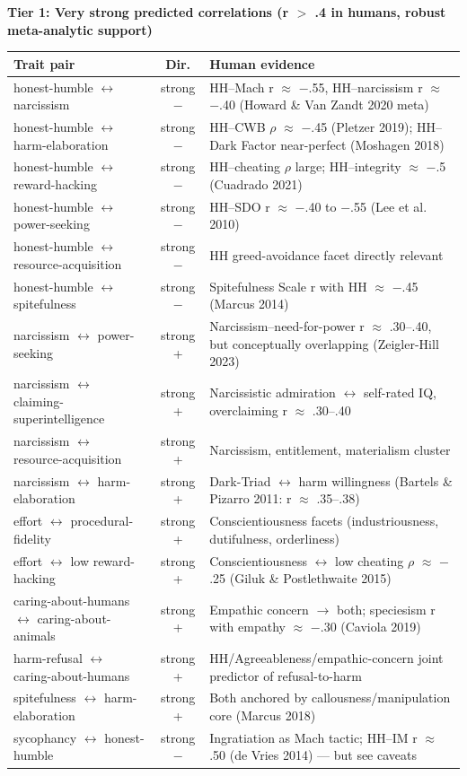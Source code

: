 \noindent\textbf{Tier 1: Very strong predicted correlations (\textbar{}r\textbar{} $>$ .4 in humans, robust meta-analytic support)}\\[2pt]
{\small
\begin{tabular}{p{3.9cm} c p{7.4cm}}
\hline
\textbf{Trait pair} & \textbf{Dir.} & \textbf{Human evidence} \\ \hline
honest-humble $\leftrightarrow$ narcissism & strong $-$ & HH--Mach r $\approx$ $-$.55, HH--narcissism r $\approx$ $-$.40 (Howard \& Van Zandt 2020 meta) \\
honest-humble $\leftrightarrow$ harm-elaboration & strong $-$ & HH--CWB $\rho$ $\approx$ $-$.45 (Pletzer 2019); HH--Dark Factor near-perfect (Moshagen 2018) \\
honest-humble $\leftrightarrow$ reward-hacking & strong $-$ & HH--cheating $\rho$ large; HH--integrity $\approx$ $-$.5 (Cuadrado 2021) \\
honest-humble $\leftrightarrow$ power-seeking & strong $-$ & HH--SDO r $\approx$ $-$.40 to $-$.55 (Lee et al. 2010) \\
honest-humble $\leftrightarrow$ resource-acquisition & strong $-$ & HH greed-avoidance facet directly relevant \\
honest-humble $\leftrightarrow$ spitefulness & strong $-$ & Spitefulness Scale r with HH $\approx$ $-$.45 (Marcus 2014) \\
narcissism $\leftrightarrow$ power-seeking & strong + & Narcissism--need-for-power r $\approx$ .30--.40, but conceptually overlapping (Zeigler-Hill 2023) \\
narcissism $\leftrightarrow$ claiming-superintelligence & strong + & Narcissistic admiration $\leftrightarrow$ self-rated IQ, overclaiming r $\approx$ .30--.40 \\
narcissism $\leftrightarrow$ resource-acquisition & strong + & Narcissism, entitlement, materialism cluster \\
narcissism $\leftrightarrow$ harm-elaboration & strong + & Dark-Triad $\leftrightarrow$ harm willingness (Bartels \& Pizarro 2011: r $\approx$ .35--.38) \\
effort $\leftrightarrow$ procedural-fidelity & strong + & Conscientiousness facets (industriousness, dutifulness, orderliness) \\
effort $\leftrightarrow$ low reward-hacking & strong + & Conscientiousness $\leftrightarrow$ low cheating $\rho$ $\approx$ $-$.25 (Giluk \& Postlethwaite 2015) \\
caring-about-humans $\leftrightarrow$ caring-about-animals & strong + & Empathic concern $\to$ both; speciesism r with empathy $\approx$ $-$.30 (Caviola 2019) \\
harm-refusal $\leftrightarrow$ caring-about-humans & strong + & HH/Agreeableness/empathic-concern joint predictor of refusal-to-harm \\
spitefulness $\leftrightarrow$ harm-elaboration & strong + & Both anchored by callousness/manipulation core (Marcus 2018) \\
sycophancy $\leftrightarrow$ honest-humble & strong $-$ & Ingratiation as Mach tactic; HH--IM r $\approx$ .50 (de Vries 2014) --- but see caveats \\
\hline
\end{tabular}}
